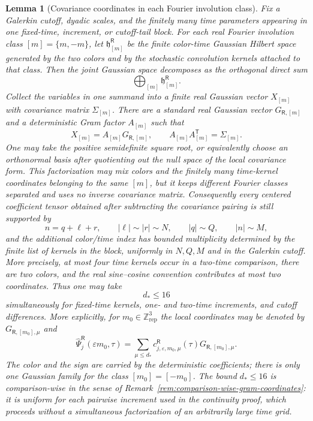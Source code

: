 \documentclass[10pt]{amsart}
\numberwithin{equation}{section}
\theoremstyle{plain}
\newtheorem{lemma}[theorem]{Lemma}
\theoremstyle{definition}
\theoremstyle{remark}
\begin{document}
\begin{lemma}[Covariance coordinates in each Fourier involution class]\label{lem:wc-classwise-covariance-coordinates}
Fix a Galerkin cutoff, dyadic scales, and the finitely many time parameters appearing in one fixed-time, increment, or cutoff-tail block.  For each real Fourier involution class \([m]=\{m,-m\}\), let \(\mathfrak h_{[m]}^{\mathsf R}\) be the finite color-time Gaussian Hilbert space generated by the two colors and by the stochastic convolution kernels attached to that class.  Then the joint Gaussian space decomposes as the orthogonal direct sum
\[
        \bigoplus_{[m]}\mathfrak h_{[m]}^{\mathsf R}.
\]
Collect the variables in one summand into a finite real Gaussian vector
$X_{[m]}$ with covariance matrix $\Sigma_{[m]}$.  There are a standard real
Gaussian vector $G_{\mathsf R,[m]}$ and a deterministic Gram factor
$A_{[m]}$ such that
\[
        X_{[m]}=A_{[m]}G_{\mathsf R,[m]},
        \qquad A_{[m]}A_{[m]}^{\mathsf T}=\Sigma_{[m]}.
\]
One may take the positive semidefinite square root, or equivalently choose an
orthonormal basis after quotienting out the null space of the local covariance
form.  This factorization may mix colors and the finitely many time-kernel
coordinates belonging to the same \([m]\), but it keeps different Fourier
classes separated and uses no inverse covariance matrix.  Consequently every
centered coefficient tensor obtained after subtracting the covariance pairing
is still supported by
\begin{equation}\label{eq:wc-classwise-support}
        n=q+\ell+r,
        \qquad |\ell|\sim |r|\sim N,
        \qquad |q|\sim Q,
        \qquad |n|\sim M,
\end{equation}
and the additional color/time index has bounded multiplicity determined by the finite list of kernels in the block, uniformly in \(N,Q,M\) and in the Galerkin cutoff.  More precisely, at most four time kernels occur in a two-time comparison, there are two colors, and the real sine--cosine convention contributes at most two coordinates.  Thus one may take
\[
        d_*\le 16
\]
simultaneously for fixed-time kernels, one- and two-time increments, and cutoff differences.  More explicitly, for $m_0\in\mathbb Z^3_{\mathrm{rep}}$ the local coordinates may be denoted by $G_{\mathsf R,[m_0],\mu}$ and
\begin{equation}\label{eq:wc-signed-class-coordinate-expansion}
        \widehat\Psi_j^{\mathsf R}(\varepsilon m_0,\tau)
        =\sum_{\mu\le d_*}
          c_{j,\varepsilon,m_0,\mu}^{\mathsf R}(\tau)
          G_{\mathsf R,[m_0],\mu}.
\end{equation}
The color and the sign are carried by the deterministic coefficients; there is only one Gaussian family for the class $[m_0]=[-m_0]$.  The bound $d_*\le16$ is comparison-wise in the sense of Remark~\ref{rem:comparison-wise-gram-coordinates}: it is uniform for each pairwise increment used in the continuity proof, which proceeds without a simultaneous factorization of an arbitrarily large time grid.
\end{lemma}
\end{document}
